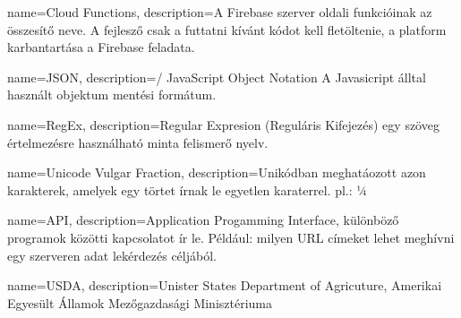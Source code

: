 {
        name=Cloud Functions,
        description={A Firebase szerver oldali funkcióinak az összesítő neve. A fejlesző csak a futtatni kívánt kódot kell fletöltenie, a platform karbantartása a Firebase feladata.}
}

{
        name=JSON,
        description={/ JavaScript Object Notation A Javasicript álltal használt objektum mentési formátum.}
}

{
        name=RegEx,
        description={Regular Expresion (Reguláris Kifejezés) egy szöveg értelmezésre használható minta felismerő nyelv.}
}

{
        name=Unicode Vulgar Fraction,
        description={Unikódban meghatáozott azon karakterek, amelyek egy törtet írnak le egyetlen karaterrel. pl.: ¼}
}


{
        name=API,
        description={Application Progamming Interface, különböző programok közötti kapcsolatot ír le. 
        Például: milyen URL címeket lehet meghívni egy szerveren adat lekérdezés céljából.}
}

{
        name=USDA,
        description={Unister States Department of Agricuture, Amerikai Egyesült Államok Mezőgazdasági Minisztériuma }
}
